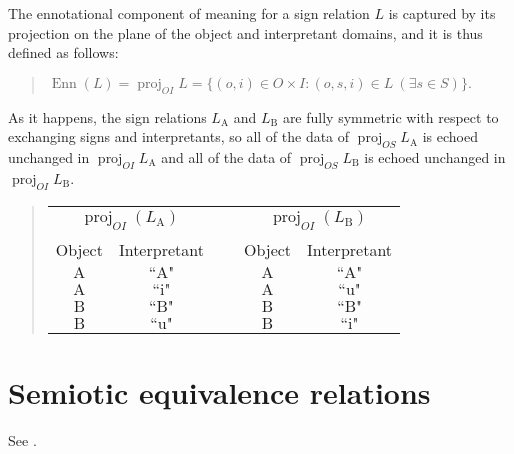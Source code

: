 \documentclass[12pt]{article}
\begin{document}
The ennotational component of meaning for a sign relation $L$ is captured by its projection on the plane of the object and interpretant domains, and it is thus defined as follows:

\begin{quote}
$\operatorname{Enn}(L) = \operatorname{proj}_{OI}L = \{ (o, i) \in O \times I : (o, s, i) \in L\ (\exists s \in S) \}.$
\end{quote}

As it happens, the sign relations $L_{\mathrm{A}}$ and $L_{\mathrm{B}}$ are fully symmetric with respect to exchanging signs and interpretants, so all of the data of $\operatorname{proj}_{OS}L_{\mathrm{A}}$ is echoed unchanged in $\operatorname{proj}_{OI}L_{\mathrm{A}}$ and all of the data of $\operatorname{proj}_{OS}L_{\mathrm{B}}$ is echoed unchanged in $\operatorname{proj}_{OI}L_{\mathrm{B}}$.

\begin{quote}\begin{tabular}{|c|c|p{2cm}|c|c|}
\multicolumn{2}{c}{$\operatorname{proj}_{OI}(L_{\mathrm{A}})$} &
\multicolumn{1}{c}{~} &
\multicolumn{2}{c}{$\operatorname{proj}_{OI}(L_{\mathrm{B}})$} \\
\cline{1-2}\cline{4-5}
Object & Interpretant & & Object & Interpretant \\
\cline{1-2}\cline{4-5}
$\mathrm{A}$ & $\text{``A"}$ &&
$\mathrm{A}$ & $\text{``A"}$ \\
\cline{1-2}\cline{4-5}
$\mathrm{A}$ & $\text{``i"}$ &&
$\mathrm{A}$ & $\text{``u"}$ \\
\cline{1-2}\cline{4-5}
$\mathrm{B}$ & $\text{``B"}$ &&
$\mathrm{B}$ & $\text{``B"}$ \\
\cline{1-2}\cline{4-5}
$\mathrm{B}$ & $\text{``u"}$ &&
$\mathrm{B}$ & $\text{``i"}$ \\
\cline{1-2}\cline{4-5}
\end{tabular}\end{quote}

\section{Semiotic equivalence relations}

See .

\end{document}
